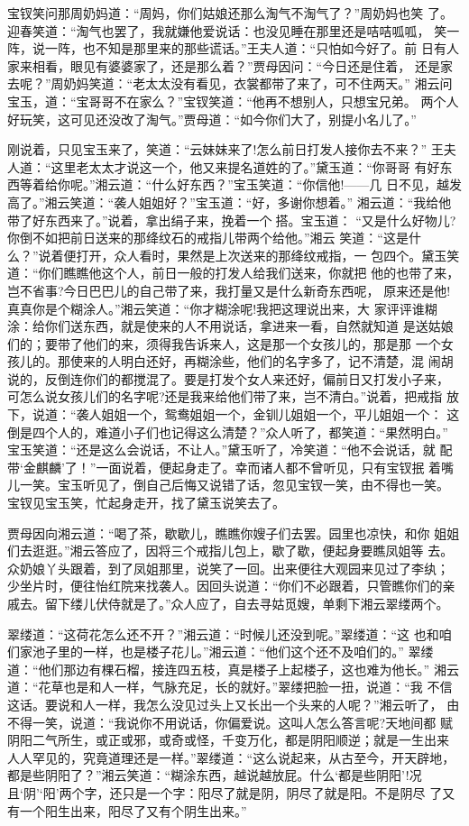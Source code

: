 宝钗笑问那周奶妈道：“周妈，你们姑娘还那么淘气不淘气了？”周奶妈也笑
了。迎春笑道：“淘气也罢了，我就嫌他爱说话：也没见睡在那里还是咭咭呱呱，
笑一阵，说一阵，也不知是那里来的那些谎话。”王夫人道：“只怕如今好了。前
日有人家来相看，眼见有婆婆家了，还是那么着？”贾母因问：“今日还是住着，
还是家去呢？”周奶妈笑道：“老太太没有看见，衣裳都带了来了，可不住两天。”
湘云问宝玉，道：“宝哥哥不在家么？”宝钗笑道：“他再不想别人，只想宝兄弟。
两个人好玩笑，这可见还没改了淘气。”贾母道：“如今你们大了，别提小名儿了。”

刚说着，只见宝玉来了，笑道：“云妹妹来了!怎么前日打发人接你去不来？”
王夫人道：“这里老太太才说这一个，他又来提名道姓的了。”黛玉道：“你哥哥
有好东西等着给你呢。”湘云道：“什么好东西？”宝玉笑道：“你信他!——几
日不见，越发高了。”湘云笑道：“袭人姐姐好？”宝玉道：“好，多谢你想着。”
湘云道：“我给他带了好东西来了。”说着，拿出绢子来，挽着一个搭。宝玉道：
“又是什么好物儿?你倒不如把前日送来的那绛纹石的戒指儿带两个给他。”湘云
笑道：“这是什么？”说着便打开，众人看时，果然是上次送来的那绛纹戒指，一
包四个。黛玉笑道：“你们瞧瞧他这个人，前日一般的打发人给我们送来，你就把
他的也带了来，岂不省事?今日巴巴儿的自己带了来，我打量又是什么新奇东西呢，
原来还是他!真真你是个糊涂人。”湘云笑道：“你才糊涂呢!我把这理说出来，大
家评评谁糊涂：给你们送东西，就是使来的人不用说话，拿进来一看，自然就知道
是送姑娘们的；要带了他们的来，须得我告诉来人，这是那一个女孩儿的，那是那
一个女孩儿的。那使来的人明白还好，再糊涂些，他们的名字多了，记不清楚，混
闹胡说的，反倒连你们的都搅混了。要是打发个女人来还好，偏前日又打发小子来，
可怎么说女孩儿们的名字呢?还是我来给他们带了来，岂不清白。”说着，把戒指
放下，说道：“袭人姐姐一个，鸳鸯姐姐一个，金钏儿姐姐一个，平儿姐姐一个：
这倒是四个人的，难道小子们也记得这么清楚？”众人听了，都笑道：“果然明白。”
宝玉笑道：“还是这么会说话，不让人。”黛玉听了，冷笑道：“他不会说话，就
配带‘金麒麟’了！”一面说着，便起身走了。幸而诸人都不曾听见，只有宝钗抿
着嘴儿一笑。宝玉听见了，倒自己后悔又说错了话，忽见宝钗一笑，由不得也一笑。
宝钗见宝玉笑，忙起身走开，找了黛玉说笑去了。

贾母因向湘云道：“喝了茶，歇歇儿，瞧瞧你嫂子们去罢。园里也凉快，和你
姐姐们去逛逛。”湘云答应了，因将三个戒指儿包上，歇了歇，便起身要瞧凤姐等
去。众奶娘丫头跟着，到了凤姐那里，说笑了一回。出来便往大观园来见过了李纨；
少坐片时，便往怡红院来找袭人。因回头说道：“你们不必跟着，只管瞧你们的亲
戚去。留下缕儿伏侍就是了。”众人应了，自去寻姑觅嫂，单剩下湘云翠缕两个。

翠缕道：“这荷花怎么还不开？”湘云道：“时候儿还没到呢。”翠缕道：“这
也和咱们家池子里的一样，也是楼子花儿。”湘云道：“他们这个还不及咱们的。”
翠缕道：“他们那边有棵石榴，接连四五枝，真是楼子上起楼子，这也难为他长。”
湘云道：“花草也是和人一样，气脉充足，长的就好。”翠缕把脸一扭，说道：“我
不信这话。要说和人一样，我怎么没见过头上又长出一个头来的人呢？”湘云听了，
由不得一笑，说道：“我说你不用说话，你偏爱说。这叫人怎么答言呢?天地间都
赋阴阳二气所生，或正或邪，或奇或怪，千变万化，都是阴阳顺逆；就是一生出来
人人罕见的，究竟道理还是一样。”翠缕道：“这么说起来，从古至今，开天辟地，
都是些阴阳了？”湘云笑道：“糊涂东西，越说越放屁。什么‘都是些阴阳’!况
且‘阴’‘阳’两个字，还只是一个字：阳尽了就是阴，阴尽了就是阳。不是阴尽
了又有一个阳生出来，阳尽了又有个阴生出来。”


